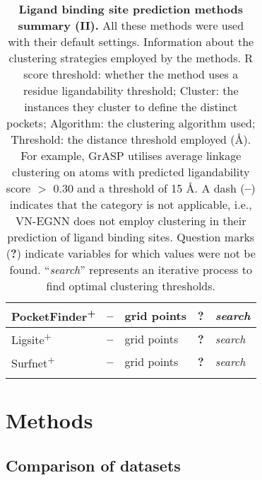 \begin{landscape}
\begin{longtable}{|M{35mm}|M{45mm}|M{35mm}|M{35mm}|M{35mm}|}
PocketFinder\textsuperscript{+} & \textbf{--}                 & grid points            & \textbf{?}         & \textit{search}         \\ \hline
Ligsite\textsuperscript{+}      & \textbf{--}                 & grid points            & \textbf{?}         & \textit{search} \\ \hline
Surfnet\textsuperscript{+}      & \textbf{--}                 & grid points            & \textbf{?}         & \textit{search}      \\ \hline
\caption[Ligand binding site prediction methods summary (II)]{\textbf{Ligand binding site prediction methods summary (II).} All these methods were used with their default settings. Information about the clustering strategies employed by the methods. R score threshold: whether the method uses a residue ligandability threshold; Cluster: the instances they cluster to define the distinct pockets; Algorithm: the clustering algorithm used; Threshold: the distance threshold employed (\AA{}). For example, GrASP utilises average linkage clustering on atoms with predicted ligandability score $>$ 0.30 and a threshold of 15 \AA{}. A dash (\textbf{--}) indicates that the category is not applicable, i.e., VN-EGNN does not employ clustering in their prediction of ligand binding sites. Question marks (\textbf{?}) indicate variables for which values were not be found. ``\textit{search}'' represents an iterative process to find optimal clustering thresholds.}
\label{tab:methods_details_2}\\
\end{longtable}
\end{landscape}

\section{Methods}

\subsection{Comparison of datasets}

